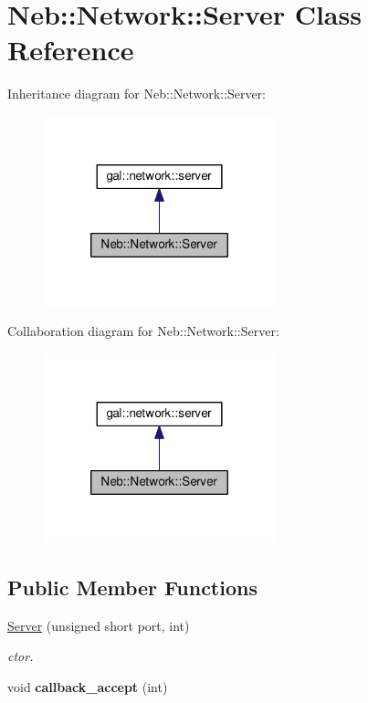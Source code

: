 \hypertarget{classNeb_1_1Network_1_1Server}{\section{Neb\-:\-:Network\-:\-:Server Class Reference}
\label{classNeb_1_1Network_1_1Server}
}


Inheritance diagram for Neb\-:\-:Network\-:\-:Server\-:
\nopagebreak
\begin{figure}[H]
\begin{center}
\leavevmode
\includegraphics[width=190pt]{classNeb_1_1Network_1_1Server__inherit__graph}
\end{center}
\end{figure}


Collaboration diagram for Neb\-:\-:Network\-:\-:Server\-:
\nopagebreak
\begin{figure}[H]
\begin{center}
\leavevmode
\includegraphics[width=190pt]{classNeb_1_1Network_1_1Server__coll__graph}
\end{center}
\end{figure}
\subsection*{Public Member Functions}
\begin{DoxyCompactItemize}
\item 
\hyperlink{classNeb_1_1Network_1_1Server_ad2765c53f9635c10ff316f3d985ab67d}{Server} (unsigned short port, int)
\begin{DoxyCompactList}\small\item\em ctor. \end{DoxyCompactList}\item 
\hypertarget{classNeb_1_1Network_1_1Server_aabb7f6cbe353b0ae3f9479e7d3745055}{void {\bfseries callback\-\_\-accept} (int)}\label{classNeb_1_1Network_1_1Server_aabb7f6cbe353b0ae3f9479e7d3745055}

\end{DoxyCompactItemize}

